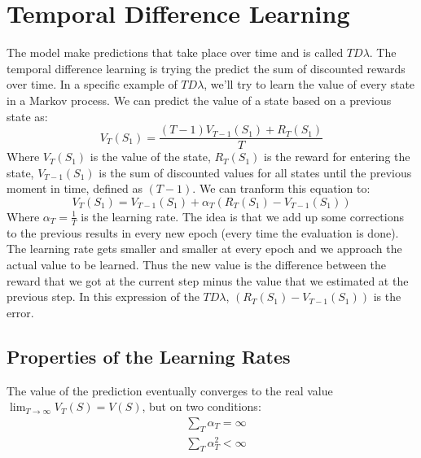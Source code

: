 \documentclass{article}
\begin{document}
\section{Temporal Difference Learning}
The model make predictions that take place over time and is called $TD\lambda$. The temporal difference learning is trying the predict the sum of discounted rewards over time. In a specific example of $TD\lambda$, we'll try to learn the value of every state in a Markov process. We can predict the value of a state based on a previous state as:
\begin{equation*}
  V_T(S_1) = \frac{(T - 1) V_{T - 1}(S_1) + R_T(S_1)}{T}
\end{equation*}
Where $V_T(S_1)$ is the value of the state, $R_T(S_1)$ is the reward for entering the state, $V_{T - 1}(S_1)$ is the sum of discounted values for all states until the previous moment in time, defined as $(T - 1)$.
We can tranform this equation to:
\begin{equation}
  V_T(S_1) = V_{T - 1}(S_1) + \alpha_T \left( R_T(S_1) - V_{T - 1}(S_1) \right)
\end{equation}
Where $\alpha_T = \frac{1}{T}$ is the learning rate. The idea is that we add up some corrections to the previous results in every new epoch (every time the evaluation is done). The learning rate gets smaller and smaller at every epoch and we approach the actual value to be learned.
Thus the new value is the difference between the reward that we got at the current step minus the value that we estimated at the previous step. In this expression of the $TD\lambda$, $\left( R_T(S_1) - V_{T - 1}(S_1) \right)$ is the error.
\subsection{Properties of the Learning Rates}
The value of the prediction eventually converges to the real value $\lim_{T\to\infty} V_T(S) = V(S)$, but on two conditions:
\begin{align}
  &\sum_{T} \alpha_T = \infty\\
  &\sum_{T} \alpha_T^2 < \infty
\end{align}
\end{document}

